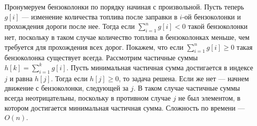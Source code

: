 \documentclass{article}
\begin{document}
Пронумеруем бензоколонки по порядку начиная с произвольной. Пусть теперь $g[i]$ --- изменение количества топлива после заправки в $i$-ой бензоколонки и прохождения дороги после нее. Тогда если $\sum\limits_{i=1}^n g[i] < 0$ такой бензоколонки нет, поскольку в таком случае количество топлива в бензоколонках меньше, чем требуется для прохождения всех дорог. Покажем, что если $\sum\limits_{i=1}^n g[i] \geqslant 0$ такая бензоколонка существует всегда. Рассмотрим частичные суммы $h[k] = \sum\limits_{i=1}^k g[i]$. Пусть минимальная частичная сумма достигается в индексе $j$ и равна $h[j]$. Тогда если $h[j] \geqslant 0$, то задача решена. Если же нет --- начнем движение с бензоколонки, следующей за $j$. В таком случае частичные суммы всегда неотрицательны, поскольку в противном случае $j$ не был элементом, в котором достигается минимальная частичная сумма. Сложность по времени --- $O(n)$. 
\end{document}
